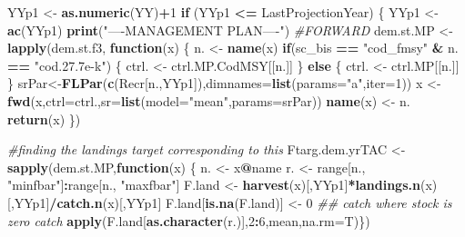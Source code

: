\documentclass[
]{article}
\newenvironment{Shaded}{\begin{snugshade}}{\end{snugshade}}
\newcommand{\CommentTok}[1]{\textcolor[rgb]{0.56,0.35,0.01}{\textit{#1}}}
\newcommand{\ControlFlowTok}[1]{\textcolor[rgb]{0.13,0.29,0.53}{\textbf{#1}}}
\newcommand{\DataTypeTok}[1]{\textcolor[rgb]{0.13,0.29,0.53}{#1}}
\newcommand{\DecValTok}[1]{\textcolor[rgb]{0.00,0.00,0.81}{#1}}
\newcommand{\KeywordTok}[1]{\textcolor[rgb]{0.13,0.29,0.53}{\textbf{#1}}}
\newcommand{\NormalTok}[1]{#1}
\newcommand{\OperatorTok}[1]{\textcolor[rgb]{0.81,0.36,0.00}{\textbf{#1}}}
\newcommand{\StringTok}[1]{\textcolor[rgb]{0.31,0.60,0.02}{#1}}
\begin{document}
\begin{Shaded}
\begin{Highlighting}[]
{{{{{\NormalTok{            YYp1 <-}\StringTok{ }\KeywordTok{as.numeric}\NormalTok{(YY)}\OperatorTok{+}\DecValTok{1}
            \ControlFlowTok{if}\NormalTok{ (YYp1 }\OperatorTok{<=}\StringTok{ }\NormalTok{LastProjectionYear) \{}
\NormalTok{                YYp1 <-}\StringTok{ }\KeywordTok{ac}\NormalTok{(YYp1)}
                \KeywordTok{print}\NormalTok{(}\StringTok{"----MANAGEMENT PLAN----"}\NormalTok{)}
                  \CommentTok{#FORWARD}
\NormalTok{                dem.st.MP <-}\StringTok{ }\KeywordTok{lapply}\NormalTok{(dem.st.f3, }\ControlFlowTok{function}\NormalTok{(x) \{}
\NormalTok{                                n. <-}\StringTok{ }\KeywordTok{name}\NormalTok{(x)}
                                \ControlFlowTok{if}\NormalTok{(sc_bis }\OperatorTok{==}\StringTok{ "cod_fmsy"} \OperatorTok{&}\StringTok{ }\NormalTok{n. }\OperatorTok{==}\StringTok{ "cod.27.7e-k"}\NormalTok{) \{}
\NormalTok{                                ctrl. <-}\StringTok{ }\NormalTok{ctrl.MP.CodMSY[[n.]]}
\NormalTok{                                \} }\ControlFlowTok{else}\NormalTok{ \{}
\NormalTok{                                  ctrl. <-}\StringTok{ }\NormalTok{ctrl.MP[[n.]] }
\NormalTok{                                \}}
\NormalTok{                                srPar<-}\KeywordTok{FLPar}\NormalTok{(}\KeywordTok{c}\NormalTok{(Recr[n.,YYp1]),}\DataTypeTok{dimnames=}\KeywordTok{list}\NormalTok{(}\DataTypeTok{params=}\StringTok{"a"}\NormalTok{,}\DataTypeTok{iter=}\DecValTok{1}\NormalTok{))}
\NormalTok{                                x <-}\StringTok{ }\KeywordTok{fwd}\NormalTok{(x,}\DataTypeTok{ctrl=}\NormalTok{ctrl.,}\DataTypeTok{sr=}\KeywordTok{list}\NormalTok{(}\DataTypeTok{model=}\StringTok{"mean"}\NormalTok{,}\DataTypeTok{params=}\NormalTok{srPar))}
                                \KeywordTok{name}\NormalTok{(x) <-}\StringTok{ }\NormalTok{n.}
                                \KeywordTok{return}\NormalTok{(x)}
\NormalTok{                                \})}

                \CommentTok{#finding the landings target corresponding to this}
\NormalTok{                Ftarg.dem.yrTAC <-}\StringTok{ }\KeywordTok{sapply}\NormalTok{(dem.st.MP,}\ControlFlowTok{function}\NormalTok{(x) \{}
\NormalTok{                                      n. <-}\StringTok{ }\NormalTok{x}\OperatorTok{@}\NormalTok{name}
\NormalTok{                                      r. <-}\StringTok{ }\NormalTok{range[n., }\StringTok{"minfbar"}\NormalTok{]}\OperatorTok{:}\NormalTok{range[n., }\StringTok{"maxfbar"}\NormalTok{]}
\NormalTok{                                      F.land <-}\StringTok{ }\KeywordTok{harvest}\NormalTok{(x)[,YYp1]}\OperatorTok{*}\KeywordTok{landings.n}\NormalTok{(x)[,YYp1]}\OperatorTok{/}\KeywordTok{catch.n}\NormalTok{(x)[,YYp1]}
\NormalTok{                                      F.land[}\KeywordTok{is.na}\NormalTok{(F.land)] <-}\StringTok{ }\DecValTok{0} \CommentTok{## catch where stock is zero catch}
                                      \KeywordTok{apply}\NormalTok{(F.land[}\KeywordTok{as.character}\NormalTok{(r.)],}\DecValTok{2}\OperatorTok{:}\DecValTok{6}\NormalTok{,mean,}\DataTypeTok{na.rm=}\NormalTok{T)\})}

}}}}}
\end{Highlighting}
\end{Shaded}
\end{document}
